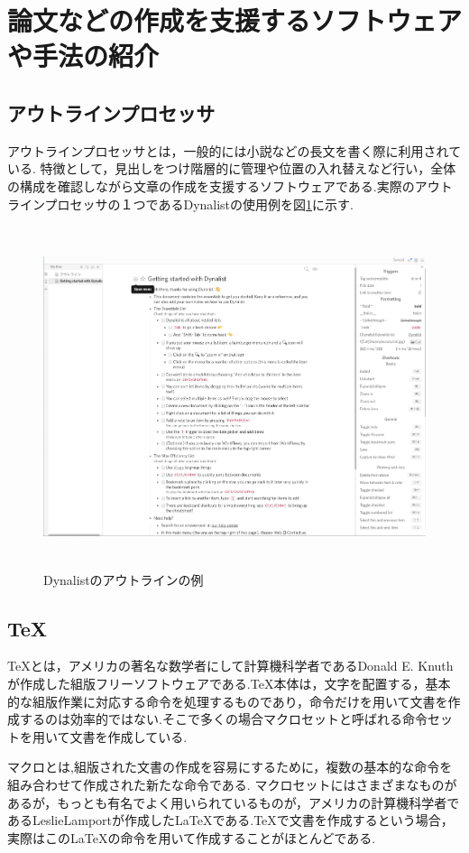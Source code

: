 \documentclass[a4j,12pt]{jarticle}
\begin{document}
\newpage

\section{論文などの作成を支援するソフトウェアや手法の紹介}
\subsection{アウトラインプロセッサ}
アウトラインプロセッサとは，一般的には小説などの長文を書く際に利用されている.
特徴として，見出しをつけ階層的に管理や位置の入れ替えなど行い，全体の構成を確認しながら文章の作成を支援するソフトウェアである.実際のアウトラインプロセッサの１つであるDynalistの使用例を図\ref{fig:b}に示す.
\begin{figure}[H]
\begin{center}
 \includegraphics[clip,width=150mm,height=100mm]{figure/Dynalist.png}
 \end{center}
 \caption{Dynalistのアウトラインの例}
 \label{fig:b}
\end{figure}
\newpage
\subsection{\TeX}
\TeX とは，アメリカの著名な数学者にして計算機科学者であるDonald E. Knuthが作成した組版フリーソフトウェアである.TeX本体は，文字を配置する，基本的な組版作業に対応する命令を処理するものであり，命令だけを用いて文書を作成するのは効率的ではない.そこで多くの場合マクロセットと呼ばれる命令セットを用いて文書を作成している.

マクロとは,組版された文書の作成を容易にするために，複数の基本的な命令を組み合わせて作成された新たな命令である.
マクロセットにはさまざまなものがあるが，もっとも有名でよく用いられているものが，アメリカの計算機科学者であるLeslieLamportが作成した\LaTeX である.\TeX で文書を作成するという場合，実際はこのLaTeXの命令を用いて作成することがほとんどである.
\end{document}

